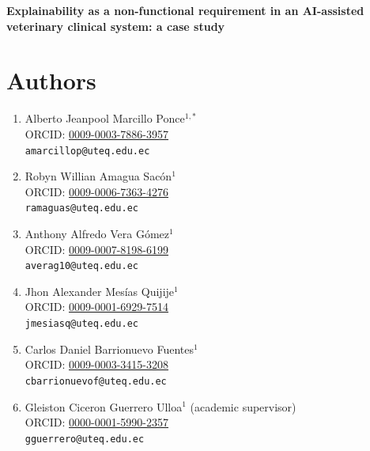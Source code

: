 \documentclass[12pt]{article}
\begin{document}

\begin{center}
{\Large\bfseries
Explainability as a non-functional requirement in an AI-assisted
veterinary clinical system: a case study
}
\end{center}

\vspace{1em}


\section*{Authors}

\begin{enumerate}

  \item Alberto Jeanpool Marcillo Ponce$^{1,\ast}$\\
  ORCID: \href{https://orcid.org/0009-0003-7886-3957}
  {0009-0003-7886-3957}\\
  \texttt{amarcillop@uteq.edu.ec}

  \item Robyn Willian Amagua Sacón$^{1}$\\
  ORCID: \href{https://orcid.org/0009-0006-7363-4276}
  {0009-0006-7363-4276}\\
  \texttt{ramaguas@uteq.edu.ec}

  \item Anthony Alfredo Vera Gómez$^{1}$\\
  ORCID: \href{https://orcid.org/0009-0007-8198-6199}
  {0009-0007-8198-6199}\\
  \texttt{averag10@uteq.edu.ec}

  \item Jhon Alexander Mesías Quijije$^{1}$\\
  ORCID: \href{https://orcid.org/0009-0001-6929-7514}
  {0009-0001-6929-7514}\\
  \texttt{jmesiasq@uteq.edu.ec}

  \item Carlos Daniel Barrionuevo Fuentes$^{1}$\\
  ORCID: \href{https://orcid.org/0009-0003-3415-3208}
  {0009-0003-3415-3208}\\
  \texttt{cbarrionuevof@uteq.edu.ec}

  \item Gleiston Ciceron Guerrero Ulloa$^{1}$ (academic supervisor)\\
  ORCID: \href{https://orcid.org/0000-0001-5990-2357}
  {0000-0001-5990-2357}\\
  \texttt{gguerrero@uteq.edu.ec}

\end{enumerate}
\end{document}
